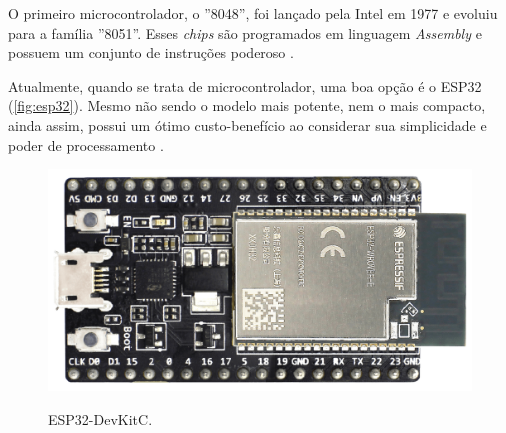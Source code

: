 O primeiro microcontrolador, o ''8048'', foi lançado pela Intel em 1977 e evoluiu 
para a família ''8051''. Esses \textit{chips} são programados em linguagem \textit{Assembly} e 
possuem um conjunto de instruções poderoso \cite{penido2013}.

Atualmente, quando se trata de microcontrolador, uma boa opção é o ESP32 (\autoref{fig:esp32}). Mesmo não 
sendo o modelo mais potente, nem o mais compacto, ainda assim, possui um ótimo 
custo-benefício ao considerar sua simplicidade e poder de processamento \cite{espressif2022c}.

\begin{figure}[h!]
    \centering
    \caption{ESP32-DevKitC.}
    \includegraphics[scale=0.13]{figuras/esp323.png} 
    \label{fig:esp32}
    \centering
\end{figure}